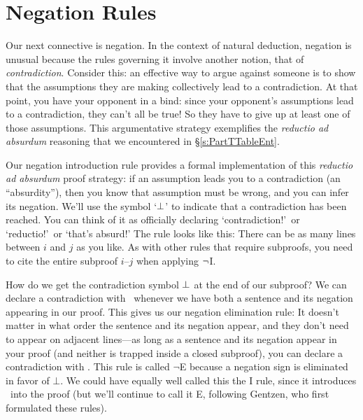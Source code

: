 \section{Negation Rules}\label{s:TFLNegationRules}



Our next connective is negation. In the context of natural deduction, negation is unusual because the rules governing it involve another notion, that of  \emph{contradiction}.  Consider this: an effective way to argue against someone is to show that the assumptions they are making collectively lead to a contradiction.  At that point, you have your opponent in a bind: since your opponent's assumptions lead to a contradiction, they can't all be true! So they have to give up at least one of those assumptions. This argumentative strategy exemplifies the \emph{reductio ad absurdum} reasoning that we encountered in \S\ref{s:PartTTableEnt}.  

Our negation introduction rule provides a formal implementation of this \emph{reductio ad absurdum} proof strategy: if an assumption leads you to a contradiction (an ``absurdity''), then you know that assumption must be wrong, and you can infer its negation.  We'll use the symbol `$\bot$' to indicate that a contradiction has been reached.  You can think of it as officially declaring `contradiction!'\ or `reductio!'\ or `that's absurd!'  The rule looks like this:
There can be as many lines between $i$ and $j$ as you like.  As with other rules that require subproofs, you need to cite the entire subproof $i$--$j$ when applying $\neg$I.  

How do we get the contradiction symbol $\bot$ at the end of our subproof? We can declare a contradiction with \ered \ whenever we  have both a sentence and its negation appearing in our proof.  This gives us our negation elimination rule:
It doesn't matter in what order the sentence and its negation appear, and they don't need to appear on adjacent lines---as long as a sentence and its negation appear in your proof (and neither is trapped inside a closed subproof), you can declare a contradiction with \ered.  This rule is called $\lnot$E because a negation sign is eliminated in favor of $\bot$.  We could have equally well called this the \ered I rule, since it introduces \ered \ into the proof (but we'll continue to call it \enot E, following Gentzen, who first formulated these rules).


